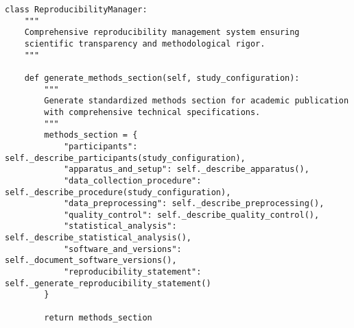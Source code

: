 \documentclass[12pt,a4paper]{article}
\begin{document}
\begin{verbatim}
class ReproducibilityManager:
    """
    Comprehensive reproducibility management system ensuring
    scientific transparency and methodological rigor.
    """
    
    def generate_methods_section(self, study_configuration):
        """
        Generate standardized methods section for academic publication
        with comprehensive technical specifications.
        """
        methods_section = {
            "participants": self._describe_participants(study_configuration),
            "apparatus_and_setup": self._describe_apparatus(),
            "data_collection_procedure": self._describe_procedure(study_configuration),
            "data_preprocessing": self._describe_preprocessing(),
            "quality_control": self._describe_quality_control(),
            "statistical_analysis": self._describe_statistical_analysis(),
            "software_and_versions": self._document_software_versions(),
            "reproducibility_statement": self._generate_reproducibility_statement()
        }
        
        return methods_section
    

\end{verbatim}
\end{document}
